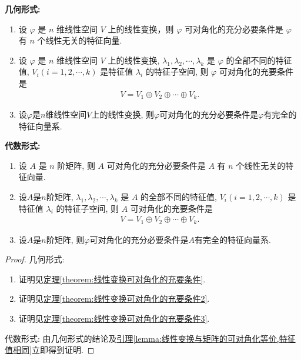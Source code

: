 \documentclass[lang=cn,newtx,10pt,scheme=chinese]{elegantbook}
\begin{document}
\begin{theorem}[线性变换可对角化的充要条件汇总]\label{theorem:线性变换可对角化的充要条件汇总}
\textbf{几何形式:}
\begin{enumerate}[(1)]
\item 设 $\varphi$ 是 $n$ 维线性空间 $V$ 上的线性变换，则 $\varphi$ 可对角化的充分必要条件是 $\varphi$ 有 $n$ 个线性无关的特征向量.

\item 设 $\varphi$ 是 $n$ 维线性空间 $V$ 上的线性变换, $\lambda_1, \lambda_2, \cdots, \lambda_k$ 是 $\varphi$ 的全部不同的特征值, $V_i (i = 1, 2, \cdots, k)$ 是特征值 $\lambda_i$ 的特征子空间, 则 $\varphi$ 可对角化的充要条件是
\begin{align*}
V = V_1 \oplus V_2 \oplus \cdots \oplus V_k.
\end{align*}

\item 设$\varphi$是$n$维线性空间$V$上的线性变换, 则$\varphi$可对角化的充分必要条件是$\varphi$有完全的特征向量系.
\end{enumerate}
\textbf{代数形式:}
\begin{enumerate}[(1)]
\item 设 $A$ 是 $n$ 阶矩阵, 则 $A$ 可对角化的充分必要条件是 $A$ 有 $n$ 个线性无关的特征向量.

\item 设$A$是$n$阶矩阵, $\lambda_1, \lambda_2, \cdots, \lambda_k$ 是 $A$ 的全部不同的特征值, $V_i (i = 1, 2, \cdots, k)$ 是特征值 $\lambda_i$ 的特征子空间, 则 $A$ 可对角化的充要条件是
\begin{align*}
V = V_1 \oplus V_2 \oplus \cdots \oplus V_k.
\end{align*}

\item 设$A$是$n$阶矩阵, 则$\varphi$可对角化的充分必要条件是$A$有完全的特征向量系.
\end{enumerate}
\end{theorem}
\begin{proof}
{\heiti 几何形式:}
\begin{enumerate}[(1)]
\item 证明见\hyperref[theorem:线性变换可对角化的充要条件]{定理\ref{theorem:线性变换可对角化的充要条件}}.

\item 证明见\hyperref[theorem:线性变换可对角化的充要条件2]{定理\ref{theorem:线性变换可对角化的充要条件2}}.

\item 证明见\hyperref[theorem:线性变换可对角化的充要条件3]{定理\ref{theorem:线性变换可对角化的充要条件3}}.
\end{enumerate}
{\heiti 代数形式:}
由几何形式的结论及\hyperref[lemma:线性变换与矩阵的可对角化等价,特征值相同]{引理\ref{lemma:线性变换与矩阵的可对角化等价,特征值相同}}立即得到证明.
\end{proof}
\end{document}
